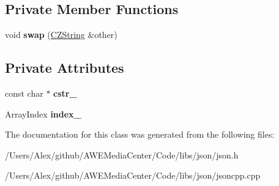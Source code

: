 \subsection*{Private Member Functions}
\begin{DoxyCompactItemize}
\item 
\hypertarget{class_json_1_1_value_1_1_c_z_string_ad59f3542d2eea749a6a63409d1a02207}{void {\bfseries swap} (\hyperlink{class_json_1_1_value_1_1_c_z_string}{C\-Z\-String} \&other)}\label{class_json_1_1_value_1_1_c_z_string_ad59f3542d2eea749a6a63409d1a02207}

\end{DoxyCompactItemize}
\subsection*{Private Attributes}
\begin{DoxyCompactItemize}
\item 
\hypertarget{class_json_1_1_value_1_1_c_z_string_a98cf8d25ae2b0fcde1cf790b62d4da2f}{const char $\ast$ {\bfseries cstr\-\_\-}}\label{class_json_1_1_value_1_1_c_z_string_a98cf8d25ae2b0fcde1cf790b62d4da2f}

\item 
\hypertarget{class_json_1_1_value_1_1_c_z_string_aecf29982235c9c165a0971023ebbb270}{Array\-Index {\bfseries index\-\_\-}}\label{class_json_1_1_value_1_1_c_z_string_aecf29982235c9c165a0971023ebbb270}

\end{DoxyCompactItemize}


The documentation for this class was generated from the following files\-:\begin{DoxyCompactItemize}
\item 
/\-Users/\-Alex/github/\-A\-W\-E\-Media\-Center/\-Code/libs/json/json.\-h\item 
/\-Users/\-Alex/github/\-A\-W\-E\-Media\-Center/\-Code/libs/json/jsoncpp.\-cpp\end{DoxyCompactItemize}
